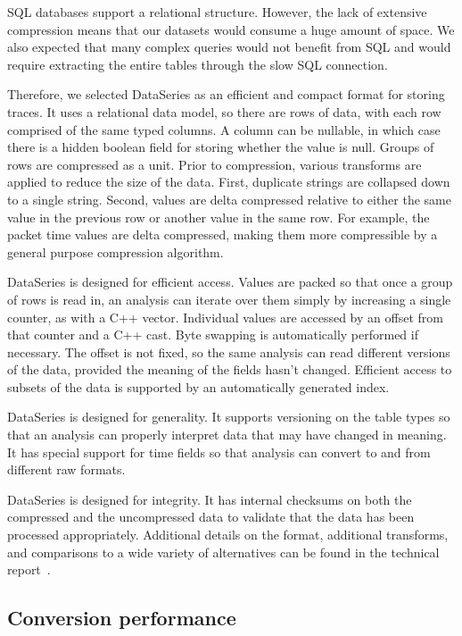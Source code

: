 SQL databases support a relational structure. However, the lack of 
extensive compression means that our datasets would 
consume a huge amount of space. We also expected that many complex
queries would not benefit from SQL and would require extracting
the entire tables through the slow SQL connection.

Therefore, we selected DataSeries as an efficient and compact format
for storing traces.  It uses a relational data model, so
there are rows of data, with each row comprised of the same typed
columns.  A column can be nullable, in which case there is a hidden
boolean field for storing whether the value is null.  Groups of rows
are compressed as a unit.  Prior to compression,
various transforms are applied to reduce the size of the data.  First,
duplicate strings are collapsed down to a single
string.  Second, values are delta compressed relative to either the
same value in the previous row or another value in the same row.  For
example, the packet time values are delta compressed, making them
more compressible by a general purpose compression algorithm.

DataSeries is designed for efficient access. Values are packed so that
once a group of rows is read in, an analysis can iterate over them
simply by increasing a single counter, as with a C++ vector.
Individual values are accessed by an offset from that
counter and a C++ cast.  Byte swapping is automatically
performed if necessary.  The offset is not fixed, so the same analysis can read
different versions of the data, provided the meaning of the fields
hasn't changed.  Efficient access to subsets of the data is supported
by an automatically generated index.

DataSeries is designed for generality. It supports versioning on the
table types so that an analysis can properly interpret data that may
have changed in meaning.  It has special support for time fields so
that analysis can convert to and from different raw formats.

DataSeries is designed for integrity.  It has internal checksums on
both the compressed and the uncompressed data to validate that the
data has been processed appropriately.  Additional details on the
format, additional transforms, and comparisons to a wide variety of
alternatives can be found in the technical
report~\cite{DSTechnicalReportSnapshot}.

\subsection{Conversion performance}

